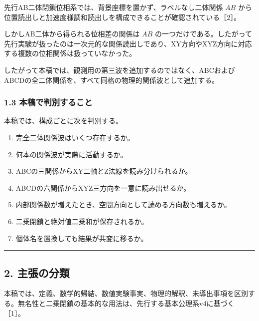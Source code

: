\documentclass[
  10pt,
  a4paper,
]{article}
\providecommand{\tightlist}{%
  \setlength{\itemsep}{0pt}\setlength{\parskip}{0pt}}
\begin{document}
先行AB二体閉鎖位相系では、背景座標を置かず、ラベルなし二体関係 \(AB\)
から位置読出しと加速度様調和読出しを構成できることが確認されている［2］。

しかしAB二体から得られる位相差の関係は \(AB\)
の一つだけである。したがって先行実験が扱ったのは一次元的な関係読出しであり、XY方向やXYZ方向に対応する複数の位相関係は扱っていなかった。

したがって本稿では、観測用の第三波を追加するのではなく、ABCおよびABCDの全二体関係を、すべて同格の物理的関係波として追加する。

\subsubsection{1.3
本稿で判別すること}\label{ux672cux7a3fux3067ux5224ux5225ux3059ux308bux3053ux3068}

本稿では、構成ごとに次を判別する。

\begin{enumerate}
\def\labelenumi{\arabic{enumi}.}
\tightlist
\item
  完全二体関係波はいくつ存在するか。
\item
  何本の関係波が実際に活動するか。
\item
  ABCの三関係からXY二軸とZ法線を読み分けられるか。
\item
  ABCDの六関係からXYZ三方向を一意に読み出せるか。
\item
  内部関係数が増えたとき、空間方向として読める方向数も増えるか。
\item
  二乗閉鎖と絶対値二乗和が保存されるか。
\item
  個体名を置換しても結果が共変に移るか。
\end{enumerate}

\begin{center}\rule{0.5\linewidth}{0.5pt}\end{center}

\subsection{2. 主張の分類}\label{ux4e3bux5f35ux306eux5206ux985e}

本稿では、定義、数学的帰結、数値実験事実、物理的解釈、未導出事項を区別する。無名性と二乗閉鎖の基本的な用法は、先行する基本公理系v4に基づく［1］。
\end{document}

